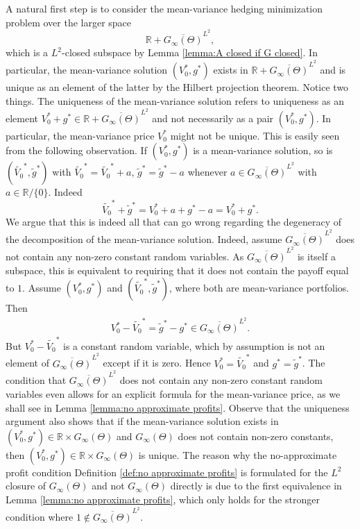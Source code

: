 \documentclass[11pt,a4paper,twoside,openany]{report}
\numberwithin{equation}{section}
\theoremstyle{plain} %
\theoremstyle{definition} %
\theoremstyle{remark} %
\begin{document}
A natural first step is to consider the mean-variance hedging minimization problem over the larger space 
\begin{equation*}
    \mathbb{R}+\overline{G_{\infty}(\Theta)}^{L^2},
\end{equation*}
which is a \(L^2\)-closed subspace by Lemma \ref{lemma:A closed if G closed}. In particular, the mean-variance solution \((V_0^*,g^*)\) exists in \(\mathbb{R}+\overline{G_{\infty}(\Theta)}^{L^2}\) and is unique as an element of the latter by the Hilbert projection theorem. Notice two things. The uniqueness of the mean-variance solution refers to uniqueness as an element \(V_0^*+g^*\in\mathbb{R}+\overline{G_{\infty}(\Theta)}^{L^2}\) and not necessarily as a pair  \((V_0^*,g^*)\). In particular, the mean-variance price \(V_0^*\) might not be unique. This is easily seen from the following observation. If  \((V_0^*,g^*)\) is a mean-variance solution, so is \((\widetilde{V_0}^*,\widetilde{g}^*)\) with \(\widetilde{V_0}^*=\widetilde{V_0}^*+a\), \(\widetilde{g}^*=\widetilde{g}^*-a\) whenever \(a\in\overline{G_{\infty}(\Theta)}^{L^2}\) with \(a\in\mathbb{R}/\{0\}\). Indeed
\begin{equation*}
    \widetilde{V_0}^*+\widetilde{g}^*=V_0^*+a+g^*-a=V_0^*+g^*.
\end{equation*}
 We argue that this is indeed all that can go wrong regarding the degeneracy of the decomposition of the mean-variance solution. Indeed, assume \(\overline{G_{\infty}(\Theta)}^{L^2}\) does not contain any non-zero constant random variables. As \(\overline{G_{\infty}(\Theta)}^{L^2}\) is itself a subspace, this is equivalent to requiring that it does not contain the payoff equal to \(1\). Assume  \((V_0^*,g^*)\) and \((\widetilde{V_0}^*,\widetilde{g}^*)\), where both are mean-variance portfolios. Then
\begin{align*}
    V_0^*-\widetilde{V_0}^*=\widetilde{g}^*-g^*\in\overline{G_{\infty}(\Theta)}^{L^2}.
\end{align*}
But \(V_0^*-\widetilde{V_0}^*\) is a constant random variable, which by assumption is not an element of \(\overline{G_{\infty}(\Theta)}^{L^2}\) except if it is zero. Hence \(V_0^*=\widetilde{V_0}^*\) and 
\(g^*=\widetilde{g}^*\). The condition that \(\overline{G_{\infty}(\Theta)}^{L^2}\) does not contain any non-zero constant random variables even allows for an explicit formula for the mean-variance price, as we shall see in Lemma \ref{lemma:no approximate profits}. Observe that the uniqueness argument also shows that if the mean-variance solution exists in \((V_0^*,g^*)\in\mathbb{R}\times G_{\infty}(\Theta)\) and \(G_{\infty}(\Theta)\) does not contain non-zero constants, then \((V_0^*,g^*)\in\mathbb{R}\times G_{\infty}(\Theta)\) is unique. The reason why the no-approximate profit condition Definition \ref{def:no approximate profits} is formulated for the \(L^2\) closure of \(G_{\infty}(\Theta)\) and not \(G_{\infty}(\Theta)\) directly is due to the first equivalence in Lemma \ref{lemma:no approximate profits}, which only holds for the stronger condition where \(1\notin\overline{G_{\infty}(\Theta)}^{L^2}\).
\end{document}
